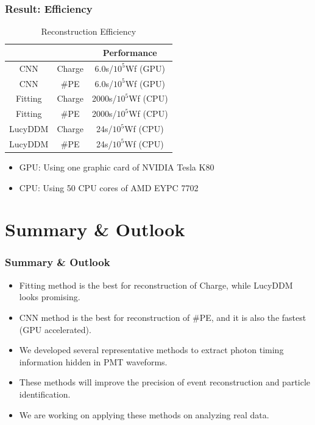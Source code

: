 \documentclass{beamer}
\begin{document}
\begin{frame}
\frametitle{Result: Efficiency}
\begin{table}
    \centering
    \caption{Reconstruction Efficiency}
    \begin{tabular}{c|c|c}
        \hline
        &  & Performance \\
        \hline
        CNN & Charge & 6.0s/$10^{5}$Wf (GPU) \\
        \hline
        CNN & \#PE & 6.0s/$10^{5}$Wf (GPU)\\
        \hline
        Fitting & Charge & 2000s/$10^{5}$Wf (CPU) \\
        \hline
        Fitting & \#PE & 2000s/$10^{5}$Wf (CPU) \\
        \hline
        LucyDDM & Charge & 24s/$10^{5}$Wf (CPU) \\
        \hline
        LucyDDM & \#PE & 24s/$10^{5}$Wf (CPU) \\
        \hline
    \end{tabular}
\end{table}
\hspace{4mm}\begin{itemize}
    \item GPU: Using one graphic card of NVIDIA Tesla K80
    \item CPU: Using 50 CPU cores of AMD EYPC 7702
\end{itemize}
\end{frame}

\section{Summary \& Outlook}
\begin{frame}
\frametitle{Summary \& Outlook}
\begin{itemize}
    \item Fitting method is the best for reconstruction of Charge, while LucyDDM looks promising. 
    \item CNN method is the best for reconstruction of \#PE, and it is also the fastest (GPU accelerated). 
    \item We developed several representative methods to extract photon timing information hidden in PMT waveforms. 
    \item These methods will improve the precision of event reconstruction and particle identification. 
    \item We are working on applying these methods on analyzing real data. 
\end{itemize}
\end{frame}
\end{document}
